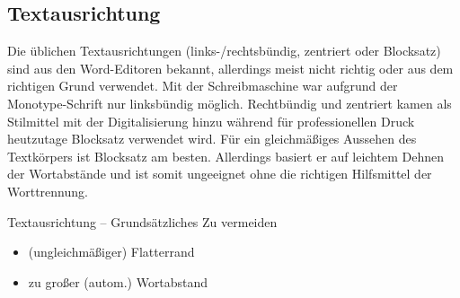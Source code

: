   
\subsection{Textausrichtung}
Die üblichen Textausrichtungen (links-/rechtsbündig,
zentriert oder Blocksatz) sind aus den Word-Editoren bekannt,
allerdings meist nicht richtig oder aus dem richtigen Grund
verwendet. Mit der Schreibmaschine war aufgrund der Monotype-Schrift
nur linksbündig möglich. Rechtbündig und zentriert kamen als
Stilmittel mit der Digitalisierung hinzu während für professionellen
Druck heutzutage Blocksatz verwendet wird. Für ein gleichmäßiges
Aussehen des Textkörpers ist Blocksatz am besten. Allerdings basiert
er auf leichtem Dehnen der Wortabstände und ist somit ungeeignet ohne
die richtigen Hilfsmittel der Worttrennung.

\begin{frame}{Textausrichtung – Grundsätzliches}
  Zu vermeiden
  \begin{itemize}
  \item (ungleichmäßiger) Flatterrand
  \item zu großer (autom.) Wortabstand
  \end{itemize}
\end{frame}

